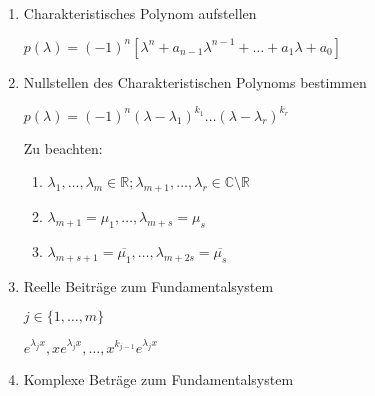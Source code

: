 \documentclass[twoside]{article}
\begin{document}
				\begin{enumerate}[1.]
					\item Charakteristisches Polynom aufstellen
					
						\begin{math}
							p(\lambda) = (-1)^n [\lambda^n + a_{n-1} \lambda^{n-1} + \dots + a_1 \lambda + a_0]
						\end{math}
					
					\item Nullstellen des Charakteristischen Polynoms bestimmen
					
						\begin{math}
							p(\lambda) = (-1)^n (\lambda - \lambda_1)^{k_1} \dots (\lambda - \lambda_r)^{k_r}
						\end{math}
						
						Zu beachten:
						
						\begin{enumerate}[]
	
							\item \begin{math} \lambda_1, \dots, \lambda_m \in \mathbb{R}; \lambda_{m+1}, \dots, \lambda_r \in \mathbb{C} \setminus \mathbb{R} \end{math}
							
							\item \begin{math} \lambda_{m+1} = \mu_1, \dots, \lambda_{m+s} = \mu_s \end{math}
							
							\item \begin{math} \lambda_{m+s+1} = \overline{\mu_1}, \dots, \lambda_{m+2s} = \overline{\mu_s} \end{math}
						
						\end{enumerate}
						
					\item Reelle Beiträge zum Fundamentalsystem
					
						\begin{math}
							j \in \{ 1, \dots, m\}
						\end{math}
						
						\begin{math}
							e^{\lambda_j x}, x e^{\lambda_j x}, \dots, x^{k_{j-1}} e^{\lambda_j x}
						\end{math}
						
					\item Komplexe Beträge zum Fundamentalsystem
					

\end{enumerate}
\end{document}
